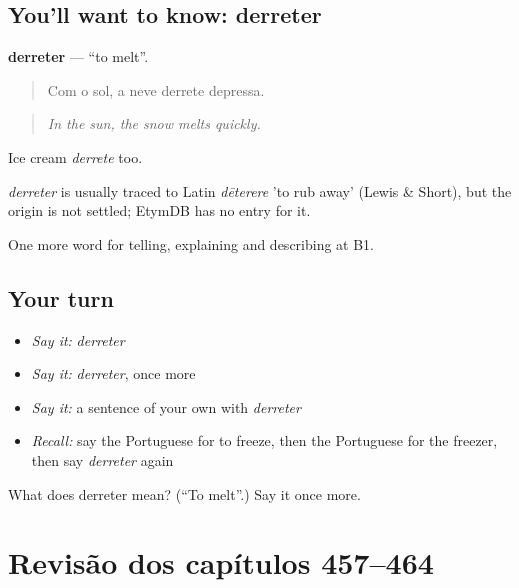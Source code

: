 \subsection*{You'll want to know: derreter}
\textbf{derreter} — \textquotedblleft{}to melt\textquotedblright{}.

\begin{quote}
Com o sol, a neve derrete depressa.
\end{quote}

\begin{quote}
\emph{In the sun, the snow melts quickly.}
\end{quote}

Ice cream \emph{derrete} too.

\begin{cousinweb}
\emph{derreter} is usually traced to Latin \emph{dēterere} 'to rub away' (Lewis \& Short), but the origin is not settled; EtymDB has no entry for it.
\end{cousinweb}

\begin{grammarlens}[title={What you've built}]
One more word for telling, explaining and describing at B1.
\end{grammarlens}

\subsection*{Your turn}
\begin{itemize}
\raggedright
  \item \emph{Say it:} \emph{derreter}
  \item \emph{Say it:} \emph{derreter}, once more
  \item \emph{Say it:} a sentence of your own with \emph{derreter}
  \item \emph{Recall:} say the Portuguese for to freeze, then the Portuguese for the freezer, then say \emph{derreter} again
\end{itemize}

\begin{tcolorbox}[breakable,colback=teal!4,colframe=teal!35!black,title={Before you move on}]
What does derreter mean? (\textquotedblleft{}To melt\textquotedblright{}.) Say it once more.
\end{tcolorbox}
\section[(dialogue)]{Revisão dos capítulos 457–464}

